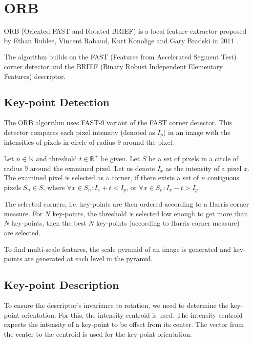 \section{ORB}
ORB (Oriented FAST and Rotated BRIEF) is a local feature extractor proposed by Ethan Rublee, Vincent Rabaud, Kurt Konolige and Gary Bradski in 2011 \cite{Rublee2011}.

The algorithm builds on the FAST (Features from Accelerated Segment Test) corner detector\cite{Rosten2006} and the BRIEF (Binary Robust Independent Elementary Features) descriptor\cite{Calonder2010}.

\subsection{Key-point Detection}
The ORB algorithm uses FAST-9 variant of the FAST corner detector. This detector compares each pixel intensity (denoted as $I_p$) in an image with the intensities of pixels in circle of radius $9$ around the pixel.

Let $n\in\mathbb{N}$ and threshold $t\in\mathbb{R}^{+}$ be given. Let $S$ be a set of pixels in a circle of radius $9$ around the examined pixel. Let us denote $I_x$ as the intensity of a pixel $x$. The examined pixel is selected as a corner, if there exists a set of $n$ contiguous pixels $S_n \in S$, where $\forall x \in S_n: I_x + t < I_p$, or $\forall x \in S_n: I_x - t > I_p$.

The selected corners, i.e. key-points are then ordered according to a Harris corner measure\cite{Harris1988}. For $N$ key-points, the threshold is selected low enough to get more than $N$ key-points, then the best $N$ key-points (according to Harris corner measure) are selected.

To find multi-scale features, the scale pyramid of an image is generated and key-points are generated at each level in the pyramid.

\subsection{Key-point Description}
To ensure the descriptor's invariance to rotation, we need to determine the key-point orientation. For this, the intensity centroid\cite{Rosin1999} is used. The intensity centroid expects the intensity of a key-point to be offset from its center. The vector from the center to the centroid is used for the key-point orientation.

